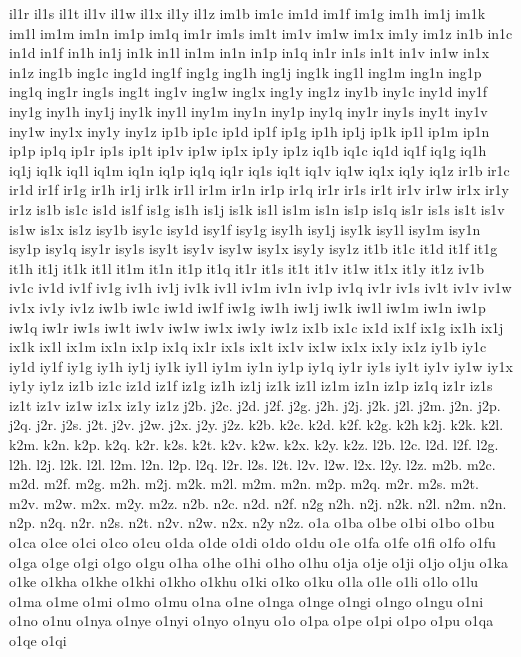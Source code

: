 {il1r
il1s
il1t
il1v
il1w
il1x
il1y
il1z
im1b
im1c
im1d
im1f
im1g
im1h
im1j
im1k
im1l
im1m
im1n
im1p
im1q
im1r
im1s
im1t
im1v
im1w
im1x
im1y
im1z
in1b
in1c
in1d
in1f
in1h
in1j
in1k
in1l
in1m
in1n
in1p
in1q
in1r
in1s
in1t
in1v
in1w
in1x
in1z
ing1b
ing1c
ing1d
ing1f
ing1g
ing1h
ing1j
ing1k
ing1l
ing1m
ing1n
ing1p
ing1q
ing1r
ing1s
ing1t
ing1v
ing1w
ing1x
ing1y
ing1z
iny1b
iny1c
iny1d
iny1f
iny1g
iny1h
iny1j
iny1k
iny1l
iny1m
iny1n
iny1p
iny1q
iny1r
iny1s
iny1t
iny1v
iny1w
iny1x
iny1y
iny1z
ip1b
ip1c
ip1d
ip1f
ip1g
ip1h
ip1j
ip1k
ip1l
ip1m
ip1n
ip1p
ip1q
ip1r
ip1s
ip1t
ip1v
ip1w
ip1x
ip1y
ip1z
iq1b
iq1c
iq1d
iq1f
iq1g
iq1h
iq1j
iq1k
iq1l
iq1m
iq1n
iq1p
iq1q
iq1r
iq1s
iq1t
iq1v
iq1w
iq1x
iq1y
iq1z
ir1b
ir1c
ir1d
ir1f
ir1g
ir1h
ir1j
ir1k
ir1l
ir1m
ir1n
ir1p
ir1q
ir1r
ir1s
ir1t
ir1v
ir1w
ir1x
ir1y
ir1z
is1b
is1c
is1d
is1f
is1g
is1h
is1j
is1k
is1l
is1m
is1n
is1p
is1q
is1r
is1s
is1t
is1v
is1w
is1x
is1z
isy1b
isy1c
isy1d
isy1f
isy1g
isy1h
isy1j
isy1k
isy1l
isy1m
isy1n
isy1p
isy1q
isy1r
isy1s
isy1t
isy1v
isy1w
isy1x
isy1y
isy1z
it1b
it1c
it1d
it1f
it1g
it1h
it1j
it1k
it1l
it1m
it1n
it1p
it1q
it1r
it1s
it1t
it1v
it1w
it1x
it1y
it1z
iv1b
iv1c
iv1d
iv1f
iv1g
iv1h
iv1j
iv1k
iv1l
iv1m
iv1n
iv1p
iv1q
iv1r
iv1s
iv1t
iv1v
iv1w
iv1x
iv1y
iv1z
iw1b
iw1c
iw1d
iw1f
iw1g
iw1h
iw1j
iw1k
iw1l
iw1m
iw1n
iw1p
iw1q
iw1r
iw1s
iw1t
iw1v
iw1w
iw1x
iw1y
iw1z
ix1b
ix1c
ix1d
ix1f
ix1g
ix1h
ix1j
ix1k
ix1l
ix1m
ix1n
ix1p
ix1q
ix1r
ix1s
ix1t
ix1v
ix1w
ix1x
ix1y
ix1z
iy1b
iy1c
iy1d
iy1f
iy1g
iy1h
iy1j
iy1k
iy1l
iy1m
iy1n
iy1p
iy1q
iy1r
iy1s
iy1t
iy1v
iy1w
iy1x
iy1y
iy1z
iz1b
iz1c
iz1d
iz1f
iz1g
iz1h
iz1j
iz1k
iz1l
iz1m
iz1n
iz1p
iz1q
iz1r
iz1s
iz1t
iz1v
iz1w
iz1x
iz1y
iz1z
j2b.
j2c.
j2d.
j2f.
j2g.
j2h.
j2j.
j2k.
j2l.
j2m.
j2n.
j2p.
j2q.
j2r.
j2s.
j2t.
j2v.
j2w.
j2x.
j2y.
j2z.
k2b.
k2c.
k2d.
k2f.
k2g.
k2h
k2j.
k2k.
k2l.
k2m.
k2n.
k2p.
k2q.
k2r.
k2s.
k2t.
k2v.
k2w.
k2x.
k2y.
k2z.
l2b.
l2c.
l2d.
l2f.
l2g.
l2h.
l2j.
l2k.
l2l.
l2m.
l2n.
l2p.
l2q.
l2r.
l2s.
l2t.
l2v.
l2w.
l2x.
l2y.
l2z.
m2b.
m2c.
m2d.
m2f.
m2g.
m2h.
m2j.
m2k.
m2l.
m2m.
m2n.
m2p.
m2q.
m2r.
m2s.
m2t.
m2v.
m2w.
m2x.
m2y.
m2z.
n2b.
n2c.
n2d.
n2f.
n2g
n2h.
n2j.
n2k.
n2l.
n2m.
n2n.
n2p.
n2q.
n2r.
n2s.
n2t.
n2v.
n2w.
n2x.
n2y
n2z.
o1a
o1ba
o1be
o1bi
o1bo
o1bu
o1ca
o1ce
o1ci
o1co
o1cu
o1da
o1de
o1di
o1do
o1du
o1e
o1fa
o1fe
o1fi
o1fo
o1fu
o1ga
o1ge
o1gi
o1go
o1gu
o1ha
o1he
o1hi
o1ho
o1hu
o1ja
o1je
o1ji
o1jo
o1ju
o1ka
o1ke
o1kha
o1khe
o1khi
o1kho
o1khu
o1ki
o1ko
o1ku
o1la
o1le
o1li
o1lo
o1lu
o1ma
o1me
o1mi
o1mo
o1mu
o1na
o1ne
o1nga
o1nge
o1ngi
o1ngo
o1ngu
o1ni
o1no
o1nu
o1nya
o1nye
o1nyi
o1nyo
o1nyu
o1o
o1pa
o1pe
o1pi
o1po
o1pu
o1qa
o1qe
o1qi
}
